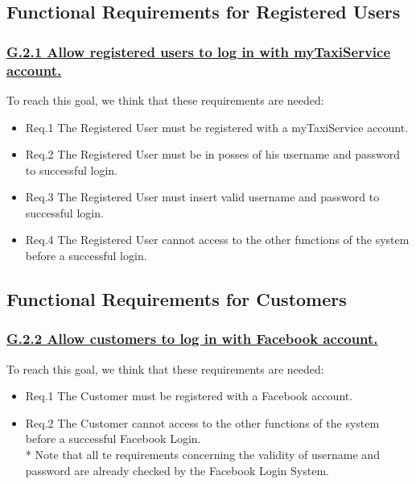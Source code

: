 \documentclass{report}
\begin{document}
		\subsection{Functional Requirements for Registered Users}

			\subsubsection{\lbrack \hyperref[sec:g2_1]{G.2.1 Allow registered users to log in with myTaxiService account.}\rbrack}
			To reach this goal, we think that these requirements are needed:

				\begin{itemize}
					\item \lbrack Req.1\rbrack \label{sec:fr1_g2_1} The Registered User must be registered with a myTaxiService account.
					\item \lbrack Req.2\rbrack \label{sec:fr2_g2_1} The Registered User must be in posses of his username and password to successful login.
					\item \lbrack Req.3\rbrack \label{sec:fr3_g2_1} The Registered User must insert valid username and password to successful login.
					\item \lbrack Req.4\rbrack \label{sec:fr4_g2_1} The Registered User cannot access to the other functions of the system before a successful login.
				\end{itemize}

		\subsection{Functional Requirements for Customers}

			\subsubsection{\lbrack \hyperref[sec:g2_2]{G.2.2 Allow customers to log in with Facebook account.}\rbrack}
			To reach this goal, we think that these requirements are needed:

				\begin{itemize}
					\item \lbrack Req.1\rbrack \label{sec:fr1_g2_2} The Customer must be registered with a Facebook account.
					\item \lbrack Req.2\rbrack \label{sec:fr2_g2_2} The Customer cannot access to the other functions of the system before a successful Facebook Login.
					\\

					* Note that all te requirements concerning the validity of username and password are already checked by the Facebook Login System. 
				\end{itemize}
\end{document}
